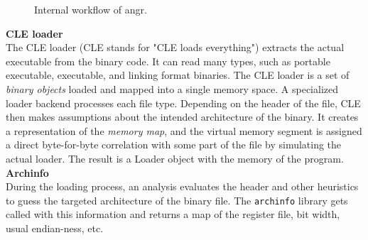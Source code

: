 \documentclass[seminar]{plai}
\begin{document}
\begin{figure}[H]
\centering
{}
\caption{Internal workflow of angr.\cite{angr-internals}}
\label{fig:angr-flow}
\end{figure}

\noindent\textbf{CLE loader}\\
The CLE loader (CLE stands for "CLE loads everything") extracts the actual executable from the binary code. It can read many types, such as portable executable, executable, and linking format binaries.
The CLE loader is a set of \textit{binary objects} loaded and mapped into a single memory space. A specialized loader backend processes each file type. Depending on the header of the file, CLE then makes assumptions about the intended architecture of the binary. It creates a representation of the \textit{memory map}, and the virtual memory segment is assigned a direct byte-for-byte correlation with some part of the file by simulating the actual loader. The result is a Loader object with the memory of the program.\cite{loading-a-binary}\\

\noindent\textbf{Archinfo}\\
During the loading process, an analysis evaluates the header and other heuristics to guess the targeted architecture of the binary file. The \texttt{archinfo} library gets called with this information and returns a map of the register file, bit width, usual endian-ness, etc.\\
\end{document}
